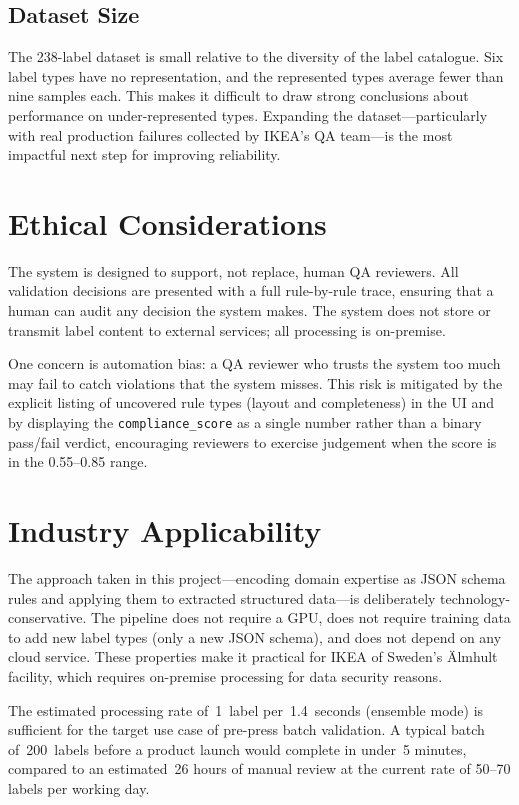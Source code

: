 \subsection{Dataset Size}

The 238-label dataset is small relative to the diversity of the label catalogue. Six label
types have no representation, and the represented types average fewer than nine samples each.
This makes it difficult to draw strong conclusions about performance on under-represented
types. Expanding the dataset—particularly with real production failures collected by IKEA's
\ac{QA} team—is the most impactful next step for improving reliability.

\section{Ethical Considerations}

The system is designed to support, not replace, human QA reviewers. All validation
decisions are presented with a full rule-by-rule trace, ensuring that a human can audit
any decision the system makes. The system does not store or transmit label content to
external services; all processing is on-premise.

One concern is automation bias: a QA reviewer who trusts the system too much may fail
to catch violations that the system misses. This risk is mitigated by the explicit listing
of uncovered rule types (layout and completeness) in the UI and by displaying the
\texttt{compliance\_score} as a single number rather than a binary pass/fail verdict,
encouraging reviewers to exercise judgement when the score is in the 0.55--0.85 range.

\section{Industry Applicability}

The approach taken in this project—encoding domain expertise as JSON schema rules and
applying them to extracted structured data—is deliberately technology-conservative. The
pipeline does not require a GPU, does not require training data to add new label types
(only a new JSON schema), and does not depend on any cloud service. These properties make
it practical for IKEA of Sweden's Älmhult facility, which requires on-premise processing
for data security reasons.

The estimated processing rate of~1~label per~1.4~seconds (ensemble mode) is sufficient
for the target use case of pre-press batch validation. A typical batch of~200~labels before
a product launch would complete in under~5 minutes, compared to an estimated~26 hours of
manual review at the current rate of 50--70 labels per working day.
